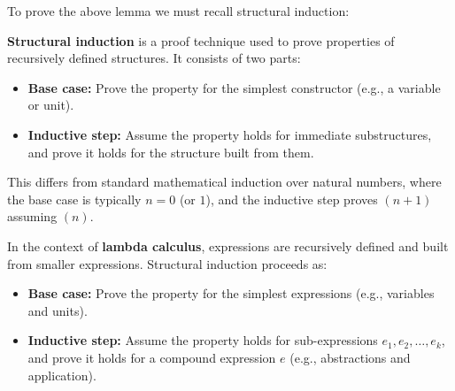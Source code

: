 \noindent 
To prove the above lemma we must recall structural induction:
\begin{Def}

    \textbf{Structural induction} is a proof technique used to prove properties of recursively defined structures. It consists of two parts:
    \begin{itemize}
        \item \textbf{Base case:} Prove the property for the simplest constructor (e.g., a variable or unit).
        \item \textbf{Inductive step:} Assume the property holds for immediate substructures, and prove it holds for the structure built from them.
    \end{itemize}
    
    \noindent
    This differs from standard mathematical induction over natural numbers, where the base case is typically $n = 0$ (or $1$), and the inductive step proves $(n+1)$ assuming $(n)$.
    
    \noindent
    In the context of \textbf{lambda calculus}, expressions are recursively defined and built from smaller expressions. Structural induction proceeds as:
    \begin{itemize}
        \item \textbf{Base case:} Prove the property for the simplest expressions (e.g., variables and units).
        \item \textbf{Inductive step:} Assume the property holds for sub-expressions $e_1, e_2, \ldots, e_k$, and prove it holds for a compound expression $e$ (e.g., abstractions and application).
    \end{itemize}
    
    \end{Def}
    
